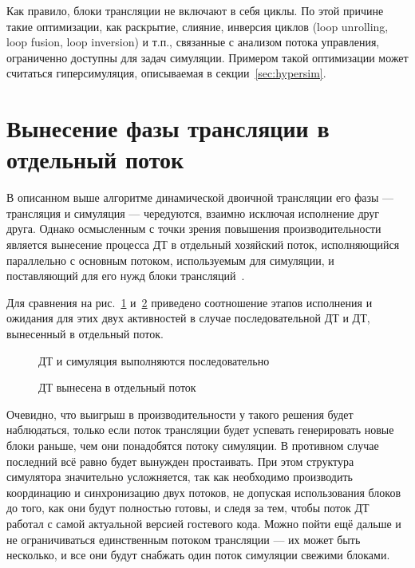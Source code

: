 Как правило, блоки трансляции не включают в себя циклы. По этой причине такие оптимизации, как раскрытие, слияние, инверсия циклов (\abbr loop unrolling, loop fusion, loop inversion) и т.п., связанные с анализом потока управления, ограниченно доступны для задач симуляции. Примером такой оптимизации может считаться гиперсимуляция, описываемая в секции~\ref{sec:hypersim}.

\section{Вынесение фазы трансляции в отдельный поток}\label{sec:parallel-bt}

В описанном выше алгоритме динамической двоичной трансляции его фазы — трансляция и симуляция — чередуются, взаимно исключая исполнение друг друга. Однако осмысленным с точки зрения повышения производительности является вынесение процесса ДТ в отдельный хозяйский поток, исполняющийся параллельно с основным потоком, используемым для симуляции, и поставляющий для его нужд блоки трансляций~\cite{pqemu2001}.

Для сравнения на рис.~\ref{fig:serial-bt} и~\ref{fig:parallel-bt} приведено соотношение этапов исполнения и ожидания для этих двух активностей в случае последовательной ДТ и ДТ, вынесенный в отдельный поток.

\begin{figure}[htb]
    \centering
    \caption{ДТ и симуляция выполняются последовательно}
    \label{fig:serial-bt}
\end{figure}

\begin{figure}[htb]
    \centering
    \caption{ДТ вынесена в отдельный поток}
    \label{fig:parallel-bt}
\end{figure}

Очевидно, что выигрыш в производительности у такого решения будет наблюдаться, только если поток трансляции будет успевать генерировать новые блоки раньше, чем они понадобятся потоку симуляции. В противном случае последний всё равно будет вынужден простаивать. При этом структура симулятора значительно усложняется, так как необходимо производить координацию и синхронизацию двух потоков, не допуская использования блоков до того, как они будут полностью готовы, и следя за тем, чтобы поток ДТ работал с самой актуальной версией гостевого кода. Можно пойти ещё дальше и не ограничиваться единственным потоком трансляции — их может быть несколько, и все они будут снабжать один поток симуляции свежими блоками.

